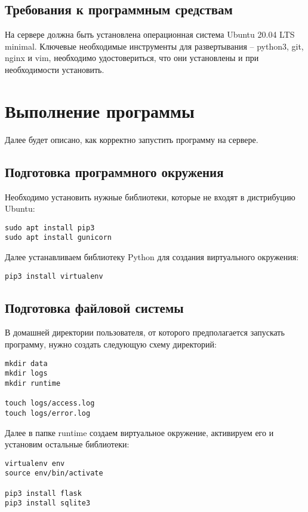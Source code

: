 \documentclass[progmanual]{espd}
\begin{document}
\subsection{Требования к программным средствам}
На сервере должна быть установлена операционная система Ubuntu 20.04 LTS minimal. Ключевые необходимые инструменты для развертывания -- python3, git, nginx и vim, необходимо удостовериться, что они установлены и при необходимости установить.

\section{Выполнение программы}
Далее будет описано, как корректно запустить программу на сервере.

\subsection{Подготовка программного окружения}
Необходимо установить нужные библиотеки, которые не входят в дистрибуцию Ubuntu:

\begin{verbatim}
sudo apt install pip3
sudo apt install gunicorn
\end{verbatim}

Далее устанавливаем библиотеку Python для создания виртуального окружения:

\begin{verbatim}
pip3 install virtualenv
\end{verbatim}

\subsection{Подготовка файловой системы}
В домашней директории пользователя, от которого предполагается запускать программу, нужно создать следующую схему директорий:

\begin{verbatim}
mkdir data
mkdir logs
mkdir runtime

touch logs/access.log
touch logs/error.log
\end{verbatim}

Далее в папке runtime создаем виртуальное окружение, активируем его и установим остальные библиотеки:

\begin{verbatim}
virtualenv env
source env/bin/activate

pip3 install flask
pip3 install sqlite3
\end{verbatim}
\end{document}
